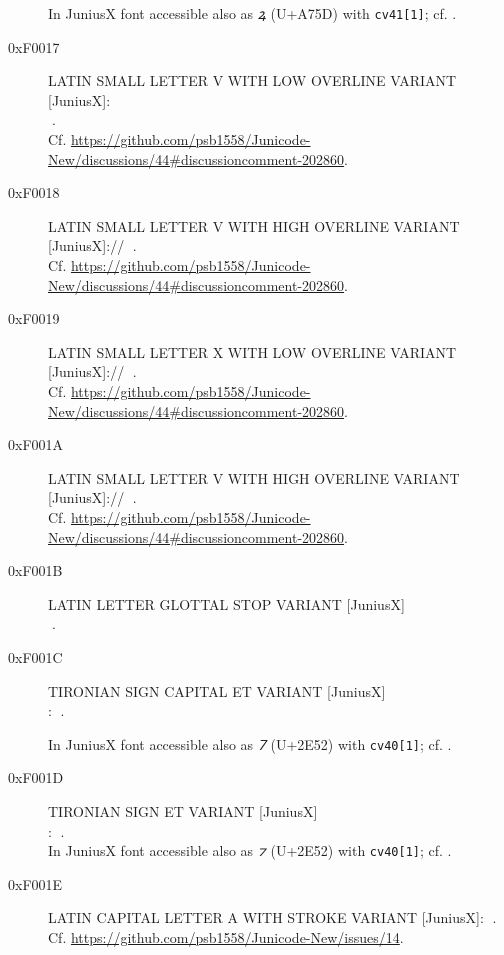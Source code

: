 \documentclass{article}
\newcommand{\Jglyph}[1]{{\relsize{2}\J#1}}
\begin{document}
\begin{description}
  In JuniusX font accessible also as \textit{ꝝ} (U+A75D) with \texttt{cv41[1]};
  cf. \autocite[p. 12]{baker20:_opent_featur_junius_junius}.
\item [0xF0017] LATIN SMALL LETTER V WITH LOW OVERLINE VARIANT [JuniusX]:\\
  \Jglyph{󰀗}.\\ Cf. \url{https://github.com/psb1558/Junicode-New/discussions/44#discussioncomment-202860}.
\item [0xF0018] LATIN SMALL LETTER V WITH HIGH OVERLINE VARIANT [JuniusX]:// 
  \Jglyph{󰀘}.\\ Cf. \url{https://github.com/psb1558/Junicode-New/discussions/44#discussioncomment-202860}.
\item [0xF0019] LATIN SMALL LETTER X WITH LOW OVERLINE VARIANT [JuniusX]:// 
  \Jglyph{󰀙}.\\ Cf. \url{https://github.com/psb1558/Junicode-New/discussions/44#discussioncomment-202860}.
\item [0xF001A] LATIN SMALL LETTER V WITH HIGH OVERLINE VARIANT [JuniusX]:// 
  \Jglyph{󰀚}.\\ Cf. \url{https://github.com/psb1558/Junicode-New/discussions/44#discussioncomment-202860}.
\item [0xF001B] LATIN LETTER GLOTTAL STOP VARIANT [JuniusX]\\
  \Jglyph{󰀛}.\\%
\item [0xF001C] TIRONIAN SIGN CAPITAL ET VARIANT [JuniusX]\\:
\Jglyph{󰀜}.%

In JuniusX font accessible also as \textit{⹒} (U+2E52) with \texttt{cv40[1]};
  cf. \autocite[p. 12]{baker20:_opent_featur_junius_junius}.

\item [0xF001D] TIRONIAN SIGN ET VARIANT [JuniusX]\\:
  \Jglyph{󰀝}.\\%
  In JuniusX font accessible also as \textit{⁊} (U+2E52) with \texttt{cv40[1]};
  cf. \autocite[p. 12]{baker20:_opent_featur_junius_junius}.

\item[0xF001E] LATIN CAPITAL LETTER A WITH STROKE
  VARIANT [JuniusX]: \Jglyph{󰀞}.\\
  Cf. \url{https://github.com/psb1558/Junicode-New/issues/14}.
  

\end{description}
\end{document}
